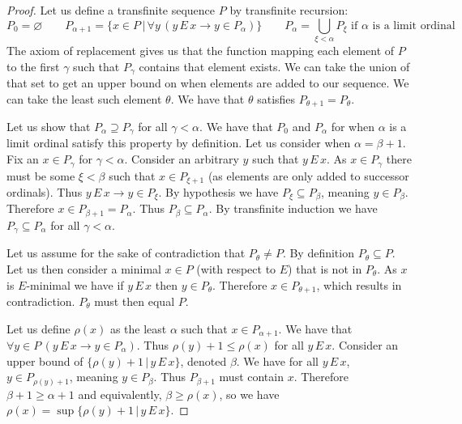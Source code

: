 \documentclass{article}
\theoremstyle{definition}
\newcommand*{\mtset}{\ensuremath{\varnothing}}
\begin{document}
\begin{proof}
    Let us define a transfinite sequence $P$ by transfinite recursion: 
    \[
        P_0 = \mtset
        \quad\quad 
        P_{\alpha + 1} = \{x \in P \, | \, \forall y \, (y \, E \, x  \to y \in P_\alpha)\} 
        \quad\quad
        P_\alpha = \bigcup_{\xi < \alpha} P_\xi \text{ if $\alpha$ is a limit ordinal}
    \]
    The axiom of replacement gives us that the function mapping each element of $P$ to the first $\gamma$ such that $P_\gamma$ contains that element exists. We can take the union of that set to get an upper bound on when elements are added to our sequence. We can take the least such element $\theta$. We have that $\theta$ satisfies $P_{\theta + 1} = P_{\theta}$. 
    
    Let us show that $P_\alpha \supseteq P_\gamma$ for all $\gamma < \alpha$. We have that $P_0$ and $P_\alpha$ for when $\alpha$ is a limit ordinal satisfy this property by definition. Let us consider when $\alpha = \beta + 1$. Fix an $x \in P_{\gamma}$ for $\gamma < \alpha$. Consider an arbitrary $y$ such that $y \, E \, x$. As $x \in P_\gamma$ there must be some $\xi < \beta$ such that $x \in P_{\xi + 1}$ (as elements are only added to successor ordinals). Thus $y \, E \, x \to y \in P_{\xi}$. By hypothesis we have $P_{\xi} \subseteq P_{\beta}$, meaning $y \in P_{\beta}$. Therefore $x \in P_{\beta + 1} = P_\alpha$. Thus $P_\beta \subseteq P_\alpha$. By transfinite induction we have $P_\gamma \subseteq P_\alpha$ for all $\gamma < \alpha$.    

    Let us assume for the sake of contradiction that $P_\theta \ne P$. By definition $P_\theta \subseteq P$. Let us then consider a minimal $x \in P$ (with respect to $E$) that is not in $P_\theta$. As $x$ is $E$-minimal we have if $y \, E \, x$ then $y \in P_\theta$. Therefore $x \in P_{\theta + 1}$, which results in contradiction. $P_\theta$ must then equal $P$.

    Let us define $\rho(x)$ as the least $\alpha$ such that $x \in P_{\alpha + 1}$. We have that $\forall y \in P \, (y \, E \, x \to y \in P_\alpha)$. Thus $\rho(y) + 1 \le \rho(x)$ for all $y \, E \, x$. Consider an upper bound of $\{ \rho(y) + 1 \, | \, y \, E \, x \}$, denoted $\beta$. We have for all $y \, E \, x$, $y \in P_{\rho(y) + 1}$, meaning $y \in P_{\beta}$. Thus $P_{\beta + 1}$ must contain $x$. Therefore $\beta + 1 \ge \alpha + 1$ and equivalently, $\beta \ge \rho(x)$, so we have $\rho(x) = \sup \{ \rho(y) + 1 \, | \, y \, E \, x \}$.
\end{proof}
\end{document}
